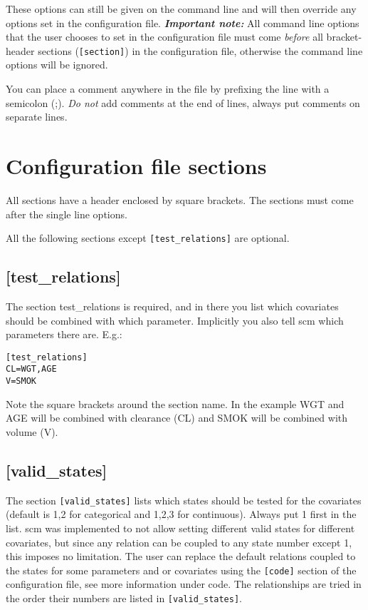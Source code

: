 These options can still be given on the command line and will then override any options set in the configuration file. \emph{\textbf{Important note:}} All command line options that the user chooses to set in the configuration file must come \emph{before} all bracket-header sections (\verb|[section]|) in the configuration file, otherwise the command line options will be ignored.

You can place a comment anywhere in the file by prefixing the line with a semicolon (;). \emph{Do not} add comments at the end of lines, always put comments on separate lines.

\section{Configuration file sections}
All sections have a header enclosed by square brackets. The sections must come after the single line options.

All the following sections except \verb|[test_relations]| are optional. 

\subsection{[test\_relations]}
The section test\_relations is required, and in there you list which covariates should be combined with which parameter. Implicitly you also tell scm which parameters there are. E.g.:

\begin{verbatim}
[test_relations]
CL=WGT,AGE
V=SMOK
\end{verbatim}

Note the square brackets around the section name. In the example WGT and AGE will be combined with clearance (CL) and SMOK will be combined with volume (V).

\subsection{[valid\_states]}
The section \verb|[valid_states]| lists which states should be tested for the covariates (default is 1,2 for categorical and 1,2,3 for continuous). Always put 1 first in the list. scm was implemented to not allow setting different valid states for different covariates, but since any relation can be coupled to any state number except 1, this imposes no limitation. The user can replace the default relations coupled to the states for some parameters and or covariates using the  \verb|[code]| section of the configuration file, see more information under code. The relationships are tried in the order their numbers are listed in \verb|[valid_states]|. 

